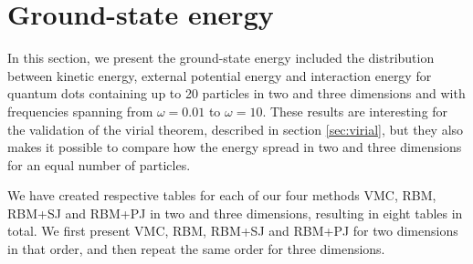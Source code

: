 \section{Ground-state energy} \label{sec:energydistribution}
In this section, we present the ground-state energy included the distribution between kinetic energy, external potential energy and interaction energy for quantum dots containing up to 20 particles in two and three dimensions and with frequencies spanning from $\omega=0.01$ to $\omega=10$. These results are interesting for the validation of the virial theorem, described in section \ref{sec:virial}, but they also makes it possible to compare how the energy spread in two  and three dimensions for an equal number of particles.

We have created respective tables for each of our four methods VMC, RBM, RBM+SJ and RBM+PJ in two and three dimensions, resulting in eight tables in total. We first present VMC, RBM, RBM+SJ and RBM+PJ for two dimensions in that order, and then repeat the same order for three dimensions. 

